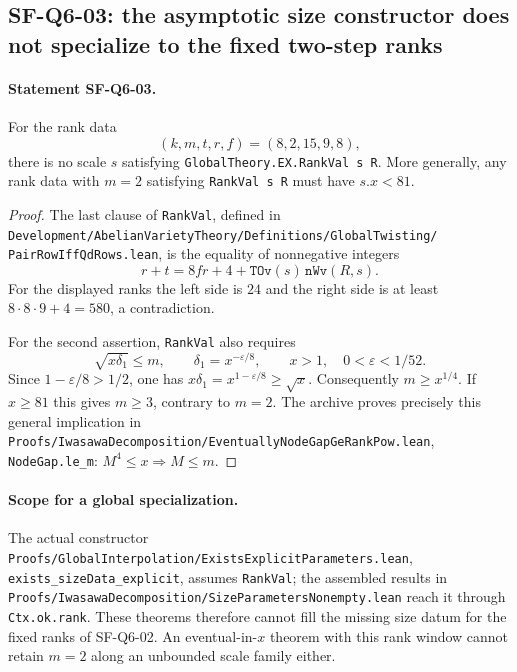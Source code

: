 \subsection{SF-Q6-03: the asymptotic size constructor does not specialize to the fixed two-step ranks}

\paragraph{Statement SF-Q6-03.}
For the rank data
\[
  (k,m,t,r,f)=(8,2,15,9,8),
\]
there is no scale $s$ satisfying \texttt{GlobalTheory.EX.RankVal s R}.
More generally, any rank data with $m=2$ satisfying
\texttt{RankVal s R} must have $s.x<81$.

\begin{proof}
The last clause of \texttt{RankVal}, defined in
\texttt{Development/AbelianVarietyTheory/Definitions/GlobalTwisting/
PairRowIffQdRows.lean}, is the equality of nonnegative integers
\[
 r+t=8fr+4+\texttt{TOv}(s)\,\texttt{nWv}(R,s).
\]
For the displayed ranks the left side is $24$ and the right side is
at least $8\cdot8\cdot9+4=580$, a contradiction.

For the second assertion, \texttt{RankVal} also requires
\[
 \sqrt{x\delta_1}\le m,\qquad
 \delta_1=x^{-\varepsilon/8},\qquad
 x>1,\quad 0<\varepsilon<1/52.
\]
Since $1-\varepsilon/8>1/2$, one has
$x\delta_1=x^{1-\varepsilon/8}\ge\sqrt{x}$.
Consequently $m\ge x^{1/4}$.  If $x\ge81$ this gives $m\ge3$,
contrary to $m=2$.  The archive proves precisely this general
implication in
\texttt{Proofs/IwasawaDecomposition/EventuallyNodeGapGeRankPow.lean},
\texttt{NodeGap.le\_m}: $M^4\le x\Rightarrow M\le m$.
\end{proof}

\paragraph{Scope for a global specialization.}
The actual constructor
\texttt{Proofs/GlobalInterpolation/ExistsExplicitParameters.lean},
\texttt{exists\_sizeData\_explicit}, assumes \texttt{RankVal};
the assembled results in
\texttt{Proofs/IwasawaDecomposition/SizeParametersNonempty.lean}
reach it through \texttt{Ctx.ok.rank}.  These theorems therefore
cannot fill the missing size datum for the fixed ranks of SF-Q6-02.
An eventual-in-$x$ theorem with this rank window cannot retain
$m=2$ along an unbounded scale family either.

